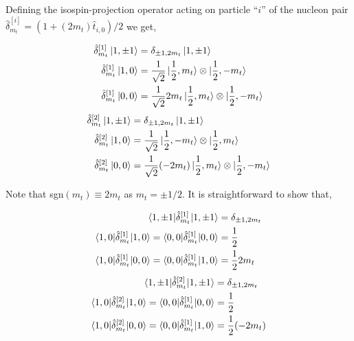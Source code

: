 \documentclass[10pt]{article}
\begin{document}
Defining the isospin-projection operator acting on particle ``$i$'' of the 
nucleon pair $ \hat{\delta}_{m_t}^{[i]} = ( 1 + (2 m_t) \hat{t}_{i,0})/2$ we 
get,
\begin{multicols}{2}
\noindent
\begin{align*}
	\hat{\delta}_{m_t}^{[1]} \ket{ 1, \pm 1} &= \delta_{\pm 1,2m_t}  \ket{ 1, \pm 1}  \\
	\hat{\delta}_{m_t}^{[1]} \ket{ 1,0} &= \frac{1}{\sqrt{2}} \ket{ \frac{1}{2}, m_t} \otimes \ket{ \frac{1}{2}, -m_t} \\
	\hat{\delta}_{m_t}^{[1]} \ket{ 0,0} &= \frac{1}{\sqrt{2}} 2 m_t \ket{ \frac{1}{2}, m_t} \otimes \ket{ \frac{1}{2}, -m_t}
\end{align*}
\begin{align*}
	\hat{\delta}_{m_t}^{[2]} \ket{ 1, \pm 1} &= \delta_{\pm 1,2m_t}  \ket{ 1, \pm 1}  \\
	\hat{\delta}_{m_t}^{[2]} \ket{ 1,0} &= \frac{1}{\sqrt{2}} \ket{ \frac{1}{2}, -m_t} \otimes \ket{ \frac{1}{2}, m_t} \\
	\hat{\delta}_{m_t}^{[2]} \ket{ 0,0} &= \frac{1}{\sqrt{2}} (-2 m_t) \ket{ \frac{1}{2}, m_t} \otimes \ket{ \frac{1}{2}, -m_t}
\end{align*}
\end{multicols}
Note that sgn$(m_t) \equiv 2m_t$ as $m_t = \pm 1/2$.
It is straightforward to show that,
\begin{multicols}{2}
\noindent
\begin{align*}
	\braket{ 1, \pm 1 | \hat{\delta}_{m_t}^{[1]} | 1, \pm 1} &= \delta_{\pm 1,2m_t}  \\
	\braket{ 1,0 | \hat{\delta}_{m_t}^{[1]} | 1,0} = \braket{ 0,0 | \hat{\delta}_{m_t}^{[1]} | 0,0} &=  \frac{1}{2} \\
	\braket{ 1,0 | \hat{\delta}_{m_t}^{[1]} | 0,0} = \braket{ 0,0 | \hat{\delta}_{m_t}^{[1]} | 1,0} &=  \frac{1}{2} 2 m_t
\end{align*}
\begin{align*}
	\braket{ 1, \pm 1 | \hat{\delta}_{m_t}^{[2]} | 1, \pm 1} &= \delta_{\pm 1,2m_t}  \\
	\braket{ 1,0 | \hat{\delta}_{m_t}^{[2]} | 1,0} = \braket{ 0,0 | \hat{\delta}_{m_t}^{[1]} | 0,0} &=  \frac{1}{2} \\
	\braket{ 1,0 | \hat{\delta}_{m_t}^{[2]} | 0,0} = \braket{ 0,0 | \hat{\delta}_{m_t}^{[1]} | 1,0} &=  \frac{1}{2} (-2 m_t) 
\end{align*}
\end{multicols}
\end{document}

